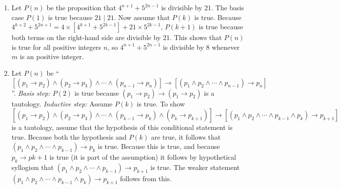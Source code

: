 \documentclass{../../cls/sig-alternate-05-2015}
\begin{document}
\begin{enumerate}
\item Let $P(n)$ be the proposition that $4^{n + 1} + 5^{2n - 1}$ is divisible by
21. The basis case $P(1)$ is true because $21 \mid 21$. Now assume
that $P(k)$ is true. Because $4^{k + 2} + 5^{2n + 1} = 4 \times [4^{k + 1} + 5^{2k - 1}] + 21 \times 5^{2k - 1}$, $P(k + 1)$ is true because both terms on
the right-hand side are divisible by 21. This shows that $P(n)$ is true for all positive integers $n$, so $4^{n + 1} + 5^{2n - 1}$ is divisible by
8 whenever $m$ is an positive integer.

\item Let $P(n)$ be \textquotedblleft $[(p_1 \rightarrow p_2) \wedge (p_2 \rightarrow p_3) \wedge \cdots \wedge (p_{n - 1} \rightarrow p_n)] \rightarrow [(p_1 \wedge p_2 \wedge \cdots \wedge p_{n - 1}) \rightarrow p_n]$\textquotedblright . \textit{Basis step:} $P(2)$ is true because $(p_1 \rightarrow p_2) \rightarrow (p_1 \rightarrow p_2)$ is a tautology. \textit{Inductive step:} Assume $P(k)$ is true. To show $[(p_1 \rightarrow p_2) \wedge (p_2 \rightarrow p_3) \wedge \cdots \wedge (p_{k - 1} \rightarrow p_k) \wedge (p_k \rightarrow p_{k + 1})] \rightarrow [(p_1 \wedge p_2 \wedge \cdots \wedge p_{k - 1} \wedge p_k) \rightarrow p_{k + 1}]$ is a tautology, assume that the hypothesis of this conditional
statement is true. Because both the hypothesis and $P(k)$ are
true, it follows that $(p_1 \wedge p_2 \wedge \cdots \wedge p_{k - 1}) \rightarrow p_k$ is true. Because
this is true, and because $p_k \rightarrow p{k + 1}$ is true (it is part
of the assumption) it follows by hypothetical syllogism that
$(p_1 \wedge p_2 \wedge \cdots \wedge p_{k - 1}) \rightarrow p_{k + 1}$ is true. The weaker statement $(p_1 \wedge p_2 \wedge \cdots \wedge p_{k - 1} \wedge p_k) \rightarrow p_{k + 1}$ follows from this.
\end{enumerate}
\end{document}
